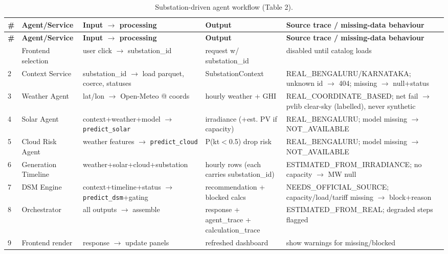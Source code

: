 \documentclass[11pt,a4paper]{article}
\newcommand{\code}[1]{\texttt{\small #1}}
\begin{document}
\begin{footnotesize}
\begin{longtable}{@{}p{0.4cm}p{2.3cm}p{3.4cm}p{3.0cm}p{3.6cm}@{}}
\caption{Substation-driven agent workflow (Table 2).}\label{tab:workflow}\\
\toprule
\textbf{\#} & \textbf{Agent/Service} & \textbf{Input $\rightarrow$ processing} & \textbf{Output} & \textbf{Source trace / missing-data behaviour}\\
\midrule
\endfirsthead
\toprule
\textbf{\#} & \textbf{Agent/Service} & \textbf{Input $\rightarrow$ processing} & \textbf{Output} & \textbf{Source trace / missing-data behaviour}\\
\midrule
\endhead
\bottomrule
\endfoot
1 & Frontend selection & user click $\rightarrow$ substation\_id & request w/ substation\_id & disabled until catalog loads\\
2 & Context Service & substation\_id $\rightarrow$ load parquet, coerce, statuses & SubstationContext & REAL\_BENGALURU/KARNATAKA; unknown id $\rightarrow$ 404; missing $\rightarrow$ null+status\\
3 & Weather Agent & lat/lon $\rightarrow$ Open-Meteo @ coords & hourly weather + GHI & REAL\_COORDINATE\_BASED; net fail $\rightarrow$ pvlib clear-sky (labelled), never synthetic\\
4 & Solar Agent & context+weather+model $\rightarrow$ \code{predict\_solar} & irradiance (+est. PV if capacity) & REAL\_BENGALURU; model missing $\rightarrow$ NOT\_AVAILABLE\\
5 & Cloud Risk Agent & weather features $\rightarrow$ \code{predict\_cloud} & P(kt$<$0.5) drop risk & REAL\_BENGALURU; model missing $\rightarrow$ NOT\_AVAILABLE\\
6 & Generation Timeline & weather+solar+cloud+substation & hourly rows (each carries substation\_id) & ESTIMATED\_FROM\_IRRADIANCE; no capacity $\rightarrow$ MW null\\
7 & DSM Engine & context+timeline+status $\rightarrow$ \code{predict\_dsm}+gating & recommendation + blocked calcs & NEEDS\_OFFICIAL\_SOURCE; capacity/load/tariff missing $\rightarrow$ block+reason\\
8 & Orchestrator & all outputs $\rightarrow$ assemble & response + agent\_trace + calculation\_trace & ESTIMATED\_FROM\_REAL; degraded steps flagged\\
9 & Frontend render & response $\rightarrow$ update panels & refreshed dashboard & show warnings for missing/blocked\\
\end{longtable}
\end{footnotesize}
\end{document}
